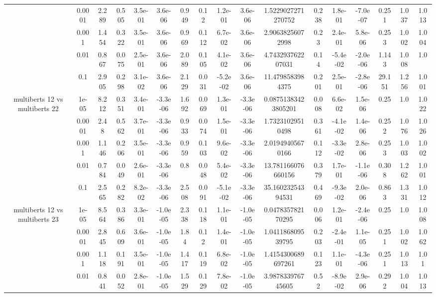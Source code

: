 \begin{tabular}{|c|c|c|c|c|c|c|c|c|c|c|c|c|c|c|c|c|}
 & 0.0001 & 2.289 & 0.505 & 3.5e-01 & 3.6e-06 & 0.949 & 0.12 & 1.2e-01 & 3.6e-06 & 1.5229027271270752 & 0.238 & 1.8e-01 & -7.0e-07 & 0.251 & 1.037 & 1.013 \\
 & 0.001 & 1.454 & 0.322 & 3.5e-01 & 3.6e-06 & 0.969 & 0.112 & 6.7e-02 & 3.6e-06 & 2.90638256072998 & 0.23 & 2.4e-01 & 5.8e-06 & 0.253 & 1.002 & 1.004 \\
 & 0.01 & 0.867 & 0.075 & 2.5e-01 & 3.6e-06 & 2.089 & 0.105 & 4.1e-02 & 3.6e-06 & 4.743293762207031 & 0.14 & -5.4e-02 & -2.0e-06 & 1.143 & 1.008 & 1.0 \\
 & 0.1 & 2.905 & 0.298 & 3.1e-02 & 3.6e-06 & 2.129 & 0.031 & -5.2e-02 & 3.6e-06 & 11.4798583984375 & 0.201 & 2.5e-01 & -2.8e-06 & 29.151 & 1.256 & 1.001 \\
\hline
\multirow{5}{*}{multiberts 12 vs multiberts 22} & 1e-05 & 8.212 & 0.351 & 3.4e-01 & -3.3e-06 & 1.692 & 0.069 & 1.3e-01 & -3.3e-06 & 0.08751383423805201 & 0.008 & 6.6e-02 & 1.5e-06 & 0.25 & 1.0 & 1.022 \\
 & 0.0001 & 2.48 & 0.562 & 3.7e-01 & -3.3e-06 & 0.933 & 0.074 & 1.5e-01 & -3.3e-06 & 1.73231029510498 & 0.361 & -4.1e-02 & 1.4e-06 & 0.252 & 1.076 & 1.026 \\
 & 0.001 & 1.146 & 0.206 & 3.5e-01 & -3.3e-06 & 0.959 & 0.103 & 9.6e-02 & -3.3e-06 & 2.01949405670166 & 0.112 & -3.3e-02 & 2.8e-06 & 0.253 & 1.003 & 1.002 \\
 & 0.01 & 0.784 & 0.049 & 2.6e-01 & -3.3e-06 & 0.8 & 0.048 & 5.4e-02 & -3.3e-06 & 13.781166076660156 & 0.379 & 1.7e-01 & -1.1e-06 & 0.308 & 1.262 & 1.001 \\
 & 0.1 & 2.565 & 0.282 & 8.2e-02 & -3.3e-06 & 2.508 & 0.091 & -5.1e-02 & -3.3e-06 & 35.16023254394531 & 0.469 & -9.3e-02 & 2.0e-06 & 0.863 & 1.331 & 1.012 \\
\hline
\multirow{5}{*}{multiberts 12 vs multiberts 23} & 1e-05 & 8.564 & 0.386 & 3.3e-01 & -1.0e-05 & 2.338 & 0.118 & 1.1e-01 & -1.0e-05 & 0.047835782170295 & 0.006 & 1.2e-01 & -2.4e-06 & 0.25 & 1.0 & 1.008 \\
 & 0.0001 & 2.845 & 0.609 & 3.6e-01 & -1.0e-05 & 1.84 & 0.12 & 1.4e-01 & -1.0e-05 & 1.041186809539795 & 0.203 & -2.4e-01 & 1.1e-05 & 0.251 & 1.002 & 1.062 \\
 & 0.001 & 1.118 & 0.191 & 3.5e-01 & -1.0e-05 & 1.417 & 0.119 & 6.8e-02 & -1.0e-05 & 1.4154300689697261 & 0.123 & 1.1e-01 & -4.3e-06 & 0.251 & 1.013 & 1.01 \\
 & 0.01 & 0.841 & 0.052 & 2.8e-01 & -1.0e-05 & 1.529 & 0.129 & 7.8e-02 & -1.0e-05 & 3.987833976745605 & 0.52 & -8.9e-02 & 2.9e-06 & 0.292 & 1.004 & 1.013 \\

\end{tabular}

